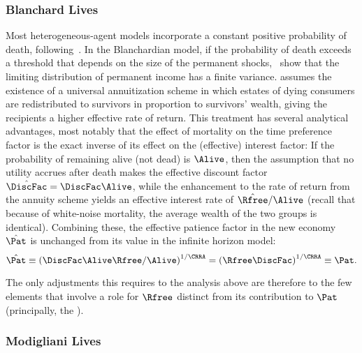 \documentclass[BufferStockTheory]{subfiles}
\begin{document}
\subsubsection{Blanchard Lives}
Most heterogeneous-agent models incorporate a constant positive probability of death, following~\cite{blanchardFinite}.  In the Blanchardian model, if the probability of death exceeds a threshold that depends on the size of the permanent shocks,~\cite{cstwMPC} show that the limiting distribution of permanent income has a finite variance.  \cite{blanchardFinite} assumes the existence of a universal annuitization scheme in which estates of dying consumers are redistributed to survivors in proportion to survivors' wealth, giving the recipients a higher effective rate of return. This treatment has several analytical advantages, most notably that the effect of mortality on the time preference factor is the exact inverse of its effect on the (effective) interest factor:  If the probability of remaining alive (not dead) is $\Alive$, then the assumption that no utility accrues after death makes the effective discount factor $\hat{\DiscFac}=\DiscFac\Alive$, while the enhancement to the rate of return from the annuity scheme yields an effective interest rate of $\hat{\Rfree}/\Alive$ (recall that because of white-noise mortality, the average wealth of the two groups is identical).  Combining these, the effective patience factor in the new economy $\hat{\Pat}$ is unchanged from its value in the infinite horizon model:%
\begin{equation}
  \hat{\Pat} \equiv {\left(\DiscFac \Alive \Rfree / \Alive\right)}^{1/\CRRA} = {\left(\Rfree \DiscFac\right)}^{1/\CRRA} \equiv \Pat.
\end{equation}

The only adjustments this requires to the analysis above are therefore to the few elements that involve a role for $\Rfree$ distinct from its contribution to $\Pat$ (principally, the {\RIC}).  %


\hypertarget{Modigliani-Lives}{}
\subsubsection{Modigliani Lives}
\end{document}
